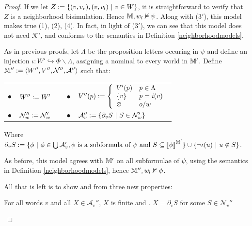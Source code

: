 \begin{proof}
  
  If we let $Z \assign \{(v, v_r), (v, v_l) \  | \  v \in
  W\}$, it is straightforward to verify that $Z$ is a neighborhood
  bisimulation.  Hence $\mathbbm{M}, w_l \nvDash \psi$.  Along with (3$'$),
  this model makes true (1), (2), (4).  In fact, in light of ($3'$), we can
  see that this model does not need $\mathcal{K}'$, and conforms to the
  semantics in Definition \ref{neighborhoodmodels}.{\hspace*{\fill}}
  
  
  
  As in previous proofs, let $\Lambda$ be the proposition letters occuring in
  $\psi$ and define an injection $\iota : W' \hookrightarrow \Phi \backslash
  \Lambda$, assigning a nominal to every world in $\mathbbm{M}'$.  Define
  $\mathbbm{M}'' \assign \langle W'', V'', \mathcal{N}'', \mathcal{A}''
  \rangle$ such that:
  
  
  
  \begin{center}
    \begin{tabular}{lllll}
      $\bullet$ & $W'' \assign W'$ &  & $\bullet$ & $V'' (p) \assign \left\{
      \begin{array}{ll}
        V' (p) & p \in \Lambda\\
        \{v\} & p = i (v)\\
        \varnothing & o / w
      \end{array} \right.$\\
      $\bullet$ & $\mathcal{N}''_w \assign \mathcal{N}'_w$ & {\hspace{3em}} &
      $\bullet$ & $\mathcal{A}''_v \assign \{\partial_v S \  |
      \  S \in \mathcal{N}'_w \}$
    \end{tabular}
  \end{center}
  
  
  
  
  
  Where $\partial_v S \assign \{\phi \  | \  \phi \in
  \bigcup \mathcal{A}_v', \text{$\phi$ is a subformula of $\psi$ and}
  \  S \subseteq \left\llbracket \phi
  \right\rrbracket^{\mathbbm{M}'} \} \cup \{\neg \iota (u) \  |
  \  u \nin S\}$.
  
  As before, this model agrees with $\mathbbm{M}'$ on all subformulae of
  $\psi$, using the semantics in Definition \ref{neighborhoodmodels}, hence
  $\mathbbm{M}'', w_l \nvDash \phi$. \
  
  
  
  All that is left is to show  and  from three
  new properties:
  \begin{enumerateroman}
    \item For all words $v$ and all $X \in \mathcal{A}_v''$, $X$ is finite and
  .  $X = \partial_v S$ for some $S \in \mathcal{N}_v''$
    

\end{enumerateroman}
\end{proof}
